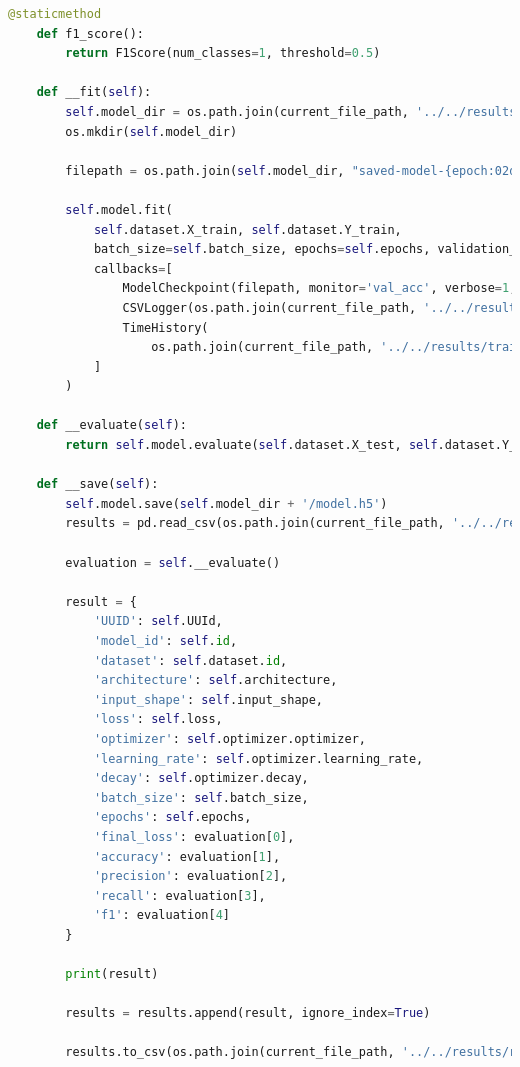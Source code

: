\documentclass{article}
\begin{document}
\begin{lstlisting}[language=Python, caption=ml.core.model.model]
    @staticmethod
    def f1_score():
        return F1Score(num_classes=1, threshold=0.5)

    def __fit(self):
        self.model_dir = os.path.join(current_file_path, '../../results/models/' + self.UUId)
        os.mkdir(self.model_dir)

        filepath = os.path.join(self.model_dir, "saved-model-{epoch:02d}-{val_accuracy:.2f}.hdf5")

        self.model.fit(
            self.dataset.X_train, self.dataset.Y_train,
            batch_size=self.batch_size, epochs=self.epochs, validation_split=0.2,
            callbacks=[
                ModelCheckpoint(filepath, monitor='val_acc', verbose=1, save_best_only=False, mode='max'),
                CSVLogger(os.path.join(current_file_path, '../../results/training/model-' + self.UUId + '.csv')),
                TimeHistory(
                    os.path.join(current_file_path, '../../results/training/model-times-' + self.UUId + '.json'))
            ]
        )

    def __evaluate(self):
        return self.model.evaluate(self.dataset.X_test, self.dataset.Y_test)

    def __save(self):
        self.model.save(self.model_dir + '/model.h5')
        results = pd.read_csv(os.path.join(current_file_path, '../../results/results.tsv'), sep='\t', header=0)

        evaluation = self.__evaluate()

        result = {
            'UUID': self.UUId,
            'model_id': self.id,
            'dataset': self.dataset.id,
            'architecture': self.architecture,
            'input_shape': self.input_shape,
            'loss': self.loss,
            'optimizer': self.optimizer.optimizer,
            'learning_rate': self.optimizer.learning_rate,
            'decay': self.optimizer.decay,
            'batch_size': self.batch_size,
            'epochs': self.epochs,
            'final_loss': evaluation[0],
            'accuracy': evaluation[1],
            'precision': evaluation[2],
            'recall': evaluation[3],
            'f1': evaluation[4]
        }

        print(result)

        results = results.append(result, ignore_index=True)

        results.to_csv(os.path.join(current_file_path, '../../results/results.tsv'), sep='\t', index=False)
\end{lstlisting}
\end{document}
